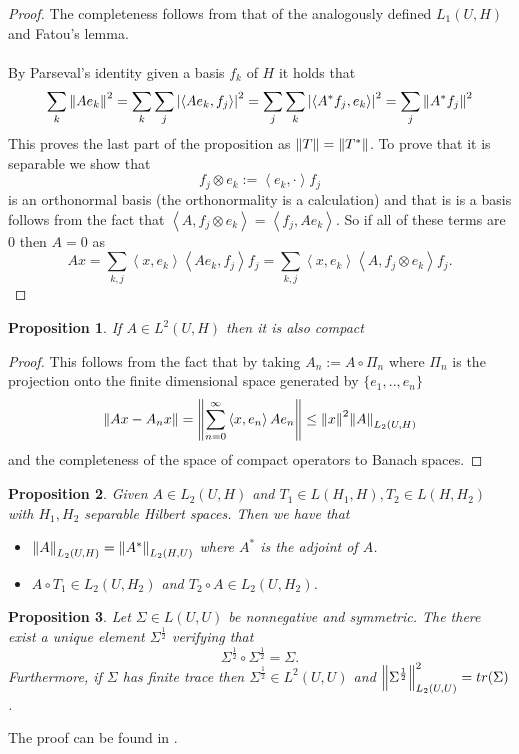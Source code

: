 \documentclass[12pt]{article}
\newcommand{\br}[1]{\left\langle#1\right\rangle}
\newtheorem{proposition}{Proposition}
\begin{document}
\begin{proof}
	The completeness follows from that of the analogously defined $L_1(U,H)$ \cite[Corollary 16.25, p.154]{hirzebruch1971einfuhrung} and Fatou's lemma.\\
	\\
	By Parseval's identity given a basis $f_k$ of $H$ it holds that
	\begin{equation*}
		\sum_k \norm{Ae_k}^2=\sum_k\sum_j\abs{\br{Ae_k,f_j}}^2=\sum_j\sum_k\abs{\br{A^*f_j,e_k}}^2=\sum_j \norm{A^*f_j}^2
	\end{equation*}
	This proves the last part of the proposition as $\norm{T}=\norm{T^*}$. To prove that it is separable we show that
	\begin{equation*}
		f_j\otimes e_k:= \br{e_k,\cdot}f_j
	\end{equation*}
	is an orthonormal basis (the orthonormality is a calculation) and that is is a basis follows from the fact that $\br{A, f_j\otimes e_k}=\br{f_j,Ae_k}$. So if all of these terms are $0$ then $A=0$ as
	\begin{equation*}
		Ax=\sum_{k,j} \br{x,e_k}\br{Ae_k,f_j}f_j=\sum_{k,j} \br{x,e_k}\br{A, f_j\otimes e_k}f_j.
	\end{equation*}
\end{proof}
\begin{proposition}
	If $A\in L^2(U,H)$ then it is also compact
\end{proposition}
\begin{proof}
	This follows from the fact that by taking $A_n:=A\circ \Pi_n$ where $\Pi_n$ is the projection onto the finite dimensional space generated by $\{e_1,..,e_n\}$
	\begin{equation*}
		\norm{Ax-A_nx}=\norm{\sum_{n=0}^\infty\br{x,e_n}Ae_n}\leq \norm{x}^2\norm{A}_{L_2(U,H)}
	\end{equation*}
	and the completeness of the space of compact operators to Banach spaces.
\end{proof}
\begin{proposition}
	Given $A\in L_2(U,H)$ and $T_1\in L(H_1,H),T_2\in L(H,H_2)$ with $H_1,H_2$ separable Hilbert spaces. Then we have that
	\begin{itemize}
		\item $\norm{A}_{L_2(U,H)}=\norm{A^*}_{L_2(H,U)}$ where $A^*$ is the adjoint of $A$.
		\item $A\circ T_1\in L_2(U,H_2)$ and $T_2\circ A\in L_2(U,H_2)$.
	\end{itemize}
\end{proposition}
\begin{proposition} Let $\Sigma\in L(U,U)$ be nonnegative and symmetric. The there exist a unique element $\Sigma^\frac{1}{2}$ verifying that
	\begin{equation*}
		\Sigma^\frac{1}{2}\circ\Sigma^\frac{1}{2}=\Sigma.
	\end{equation*}
	Furthermore, if $\Sigma$ has finite trace then $\Sigma^\frac{1}{2}\in L^2(U,U)$ and $\norm{\Sigma^\frac{1}{2}}_{L_2(U,U)}^2=tr(\Sigma)$.
\end{proposition}
The proof can be found in \cite[p.196]{reed1972methods}.
\end{document}
